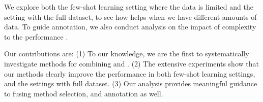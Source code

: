 We explore both the few-shot learning setting where the data is limited and the setting with the full dataset, to see how \RE helps when we have different amounts of data.
To guide \RE annotation, we also conduct analysis on the impact of \RE complexity to the performance \NN.

Our contributions are: (1) To our knowledge, we are the first to systematically investigate methods for combining \RE and \NN. (2) The extensive experiments show that our methods clearly improve the \NN performance in both few-shot learning settings, and the settings with full dataset. (3) Our analysis provides meaningful guidance to fusing method selection, and \RE annotation as well.
